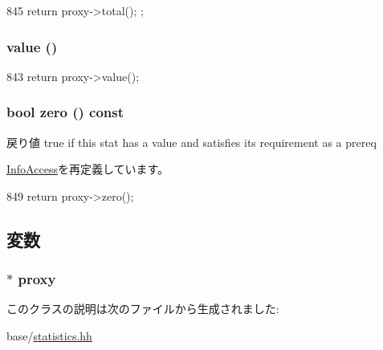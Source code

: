 \begin{DoxyCode}
845 { return proxy->total(); };
\end{DoxyCode}
\hypertarget{classStats_1_1ValueBase_aced120d8613c6808b53daaa566cbaa27}{
\subsubsection[{value}]{ value ()}}
\label{classStats_1_1ValueBase_aced120d8613c6808b53daaa566cbaa27}



\begin{DoxyCode}
843 { return proxy->value(); }
\end{DoxyCode}
\hypertarget{classStats_1_1ValueBase_a4e72b01b727d3165e75cba84eb507491}{
\subsubsection[{zero}]{\setlength{\rightskip}{0pt plus 5cm}bool zero () const}}
\label{classStats_1_1ValueBase_a4e72b01b727d3165e75cba84eb507491}
\begin{DoxyReturn}{戻り値}
true if this stat has a value and satisfies its requirement as a prereq 
\end{DoxyReturn}


\hyperlink{classStats_1_1InfoAccess_a4e72b01b727d3165e75cba84eb507491}{InfoAccess}を再定義しています。


\begin{DoxyCode}
849 { return proxy->zero(); }
\end{DoxyCode}


\subsection{変数}
\hypertarget{classStats_1_1ValueBase_a3afc53fa5e063d851b5f9af7ad1b05b7}{
\subsubsection[{proxy}]{$\ast$ {\bf proxy}}}
\label{classStats_1_1ValueBase_a3afc53fa5e063d851b5f9af7ad1b05b7}


このクラスの説明は次のファイルから生成されました:\begin{DoxyCompactItemize}
\item 
base/\hyperlink{statistics_8hh}{statistics.hh}\end{DoxyCompactItemize}
